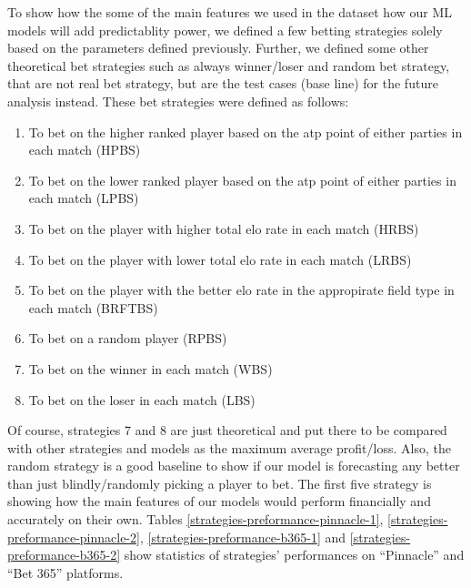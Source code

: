 \documentclass[preprint,aps,nofootinbib,a4paper,superscriptaddress,longbibliography,amsfonts,amssymb,amsmath,titlepage]{revtex4-2}
\begin{document}
To show how the some of the main features we used in the dataset how our ML models will add predictablity power, we defined a few betting strategies solely based on the parameters defined previously. Further, we defined some other theoretical bet strategies such as always winner/loser and random bet strategy, that are not real bet strategy, but are the test cases (base line) for the future analysis instead. These bet strategies were defined as follows:
%
\begin{enumerate}
\item To bet on the higher ranked player based on the atp point of either parties in each match (HPBS)
\item To bet on the lower ranked player based on the atp point of either parties in each match (LPBS)
\item To bet on the player with higher total elo rate in each match (HRBS)
\item To bet on the player with lower total elo rate in each match (LRBS)
\item To bet on the player with the better elo rate in the appropirate field type in each match (BRFTBS)
\item To bet on a random player (RPBS)
\item To bet on the winner in each match (WBS)
\item To bet on the loser in each match (LBS)
\end{enumerate}
%
Of course, strategies 7 and 8 are just theoretical and put there to be compared with other strategies and models as the maximum average profit/loss. Also, the random strategy is a good baseline to show if our model is forecasting any better than just blindly/randomly picking a player to bet. The first five strategy is showing how the main features of our models would perform financially and accurately on their own. Tables \ref{strategies-preformance-pinnacle-1}, \ref{strategies-preformance-pinnacle-2}, \ref{strategies-preformance-b365-1} and \ref{strategies-preformance-b365-2} show statistics of strategies' performances on ``Pinnacle'' and ``Bet 365'' platforms.
%
\end{document}
